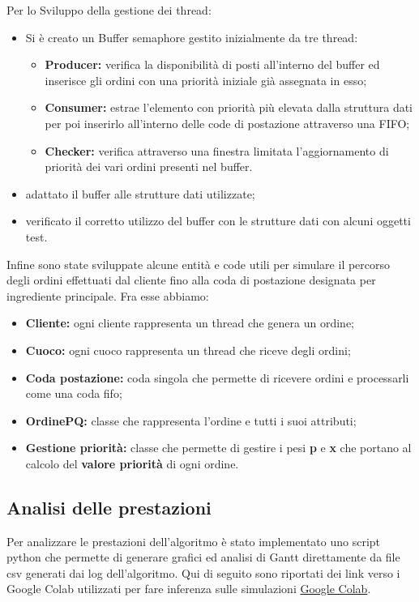 Per lo Sviluppo della gestione dei thread:
\begin{itemize}
    \item Si è creato un Buffer semaphore gestito inizialmente da tre thread:
    \begin{itemize}
        \item \textbf{Producer:} verifica la disponibilità di posti all'interno del buffer ed inserisce gli ordini con una priorità iniziale già assegnata in esso;
        \item \textbf{Consumer:} estrae l'elemento con priorità più elevata dalla struttura dati per poi inserirlo all'interno delle code di postazione attraverso una FIFO;
        \item \textbf{Checker:} verifica attraverso una finestra limitata l'aggiornamento di priorità dei vari ordini presenti nel buffer. 
    \end{itemize}
    \item adattato il buffer alle strutture dati utilizzate;
    \item verificato il corretto utilizzo del buffer con le strutture dati con alcuni oggetti test.
\end{itemize}

Infine sono state sviluppate alcune entità e code utili per simulare il percorso degli ordini effettuati dal cliente fino alla coda di postazione designata per ingrediente principale. 
Fra esse abbiamo:
\begin{itemize}
	\item \textbf{Cliente:} ogni cliente rappresenta un thread che genera un ordine;
	\item \textbf{Cuoco:} ogni cuoco rappresenta un thread che riceve degli ordini;
	\item \textbf{Coda postazione:} coda singola che permette di ricevere ordini e processarli come una coda fifo;
	\item \textbf{OrdinePQ:} classe che rappresenta l'ordine e tutti i suoi attributi;
	\item \textbf{Gestione priorità:} classe che permette di gestire i pesi \textbf{p} e \textbf{x} che portano al calcolo del \textbf{valore priorità} di ogni ordine.
\end{itemize}

\subsection{Analisi delle prestazioni}

Per analizzare le prestazioni dell'algoritmo è stato implementato uno script python che permette di generare grafici ed analisi di Gantt direttamente da file csv generati dai log dell'algoritmo. 
Qui di seguito sono riportati dei link verso i Google Colab utilizzati per fare inferenza sulle simulazioni \href{https://colab.research.google.com/drive/1hyGN4p6SS00ENY7n0lPa2CBTDqbqRAC_?usp=sharing}{Google Colab}.

